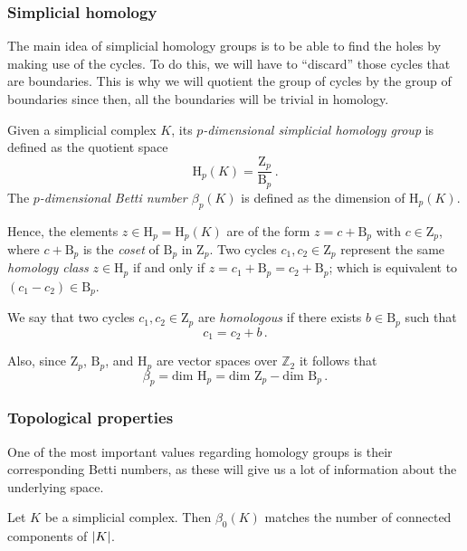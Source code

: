 \documentclass[../main.tex]{subfiles}
\begin{document}
\subsubsection*{Simplicial homology}
The main idea of simplicial homology groups is to be able to find the holes by making use of the cycles. To do this, we will have to ``discard'' those cycles that are boundaries. This is why we will quotient the group of cycles by the group of boundaries since then, all the boundaries will be trivial in homology.

\begin{definition}
Given a simplicial complex $K$, its \emph{$p$-dimensional simplicial homology group} is defined as the quotient space
\[
\text{H}_p(K)=\dfrac{\text{Z}_p}{\text{B}_p}\,.
\]
The \emph{$p$-dimensional Betti number $\beta_p(K)$} is defined as the dimension of $\text{H}_p(K)$.
\end{definition}

Hence, the elements $z \in \text{H}_p = \text{H}_p(K)$ are of the form $z = c + \text{B}_p$ with $c \in \text{Z}_p$, where $c + \text{B}_p$ is the \emph{coset} of $\text{B}_p$ in $\text{Z}_p$. Two cycles $c_1, c_2 \in \text{Z}_p$ represent the same \emph{homology class} $z \in \text{H}_p$ if and only if $z= c_1 + \text{B} _p = c_2 + \text{B}_p$; which is equivalent to $(c_1-c_2) \in \text{B}_p$.

\begin{definition}
We say that two cycles $c_1, c_2 \in \text{Z}_p$ are \emph{homologous} if there exists $b \in \text{B}_p$ such that
\[
c_1 = c_2 + b\,.
\]
\end{definition}

Also, since $\text{Z}_p$, $\text{B}_p$, and $\text{H}_p$ are vector spaces over $\mathbb{Z}_2$ it follows that
\[
\beta_p = \text{dim } \text{H}_p = \text{dim } \text{Z}_p - \text{dim } \text{B}_p\,.
\]


\subsubsection*{Topological properties}

One of the most important values regarding homology groups is their corresponding Betti numbers, as these will give us a lot of information about the underlying space.
\begin{theorem}
Let $K$ be a simplicial complex. Then $\beta_0(K)$ matches the number of connected components of $\left\lvert K \right\rvert$.
\end{theorem}
\end{document}
